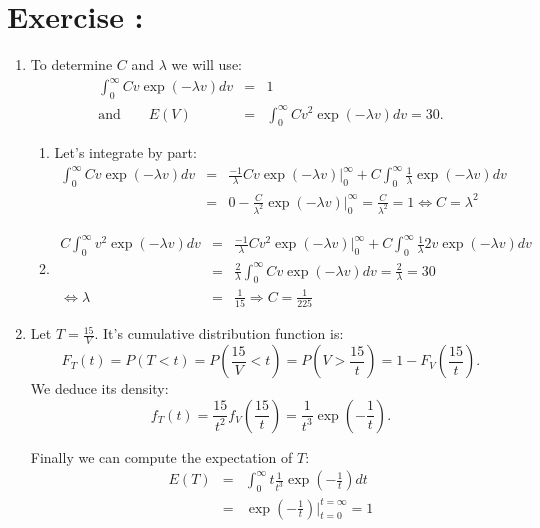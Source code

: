 \documentclass[12pt,thmsa]{article}
\begin{document}
\addtocounter{section}{1}
\section*{Exercise \thesection:}


\begin{enumerate}
  \item To determine $C$ and $\lambda$ we will use:
  \begin{eqnarray*}
    \int_0^{\infty} C v \exp(-\lambda v)dv&=& 1 \\
    \text{and} \qquad E(V) &=& \int_0^{\infty} C v^2 \exp(-\lambda v)dv = 30.
  \end{eqnarray*}

\begin{enumerate}
  \item Let's integrate by part:
  \begin{eqnarray*}
    \int_0^{\infty} C v \exp(-\lambda v)dv &=& \frac{-1}{\lambda} Cv \exp(-\lambda v)\bigg\vert_0^\infty + C \int_0^\infty \frac{1}{\lambda} \exp(-\lambda v) dv\\
     &=&  0- \frac{C}{\lambda^2}  \exp(-\lambda v) \bigg\vert_0^\infty = \frac{C}{\lambda^2} =1  \Leftrightarrow C=\lambda^2
  \end{eqnarray*}

  \item
    \begin{eqnarray*}
    C \int_0^{\infty}  v^2 \exp(-\lambda v)dv &=& \frac{-1}{\lambda} Cv^2 \exp(-\lambda v)\bigg\vert_0^\infty + C \int_0^\infty \frac{1}{\lambda} 2v\exp(-\lambda v) dv\\
     &=&  \frac{2}{\lambda} \int_0^\infty C v\exp(-\lambda v) dv = \frac{2}{\lambda}= 30  \\
     \Leftrightarrow \lambda &=& \frac{1}{15}  \Rightarrow C=\frac{1}{225}
  \end{eqnarray*}
\end{enumerate}


  \item Let $T=\frac{15}{V}$. It's cumulative distribution function is:
  \begin{equation*}
  F_T(t)=P(T<t)=P\left(\frac{15}{V}<t\right)=P\left(V>\frac{15}{t}\right)=1-F_V\left(\frac{15}{t}\right).
  \end{equation*}
  We deduce its density:
  \begin{equation*}
  f_T(t)=\frac{15}{t^2}f_V\left(\frac{15}{t}\right)=\frac{1}{t^3} \exp\left(-\frac{1}{t}\right).
  \end{equation*}

  Finally we can compute the expectation of $T$:
  \begin{eqnarray*}
    E(T) &=& \int_0^\infty t \frac{1}{t^3} \exp\left(-\frac{1}{t}\right) dt \\
     &=& \exp\left(-\frac{1}{t}\right) \bigg\vert_{t=0}^{t=\infty}=1
  \end{eqnarray*}
\end{enumerate}
\end{document}

